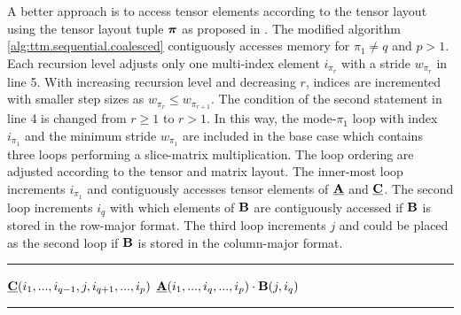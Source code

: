 A better approach is to access tensor elements according to the tensor layout using the tensor layout tuple $\boldsymbol{\pi}$ as proposed in \cite{bassoy:2018:fast}.
The modified algorithm \ref{alg:ttm.sequential.coalesced} contiguously accesses memory for $\pi_1 \neq q$ and $p > 1$.
Each recursion level adjusts only one multi-index element $i_{\pi_r}$ with a stride $w_{\pi_r}$ in line 5.
With increasing recursion level and decreasing $r$, indices are incremented with smaller step sizes as $w_{\pi_r} \leq w_{\pi_{r+1}}$. 
The condition of the second  statement in line 4 is changed from $r \geq 1$ to $r > 1$.
In this way, the mode-$\pi_1$ loop with index $i_{\pi_1}$ and the minimum stride $w_{\pi_1}$ are included in the base case which contains three loops performing a slice-matrix multiplication. 
The loop ordering are adjusted according to the tensor and matrix layout.
The inner-most loop increments $i_{\pi_1}$ and contiguously accesses tensor elements of $\mubA$ and $\mubC$.
The second loop increments $i_q$ with which elements of $\mathbf{B}$ are contiguously accessed if $\mathbf{B}$ is stored in the row-major format.
The third loop increments $j$ and could be placed as the second loop if $\mathbf{B}$ is stored in the column-major format.

\begin{algorithm}[t]
\DontPrintSemicolon
{}
%
\footnotesize 
\SetAlgoVlined
\hrule
\BlankLine
{}
{
	{
	}
	{
		{
			\;
		}		
	}	
	\Else%
	{
		{
			{			
				{
					$\underline{\mathbf{C}}(i_1,...,i_{q-1},j,i_{q+1},...,i_{p})$ \ttt{+=} $\underline{\mathbf{A}}(i_1,...,i_q,...,i_p) \cdot \mathbf{B}(j,i_q)$\;
				}
			}
		}
	}
}
\BlankLine
\hrule
\caption{
\footnotesize %
Modified baseline algorithm with contiguous memory access for the tensor-matrix multiplication.
The tensor order must be greater than one and for the contraction mode $1 \leq q \leq p$ and $\pi_1 \neq q$ must hold.
The algorithm needs to be initially called with $r=p$ where $\mbn$ is the shape tuple of $\mubA$ and $m$ is the $q$-th dimension of $\mubC$. 
\label{alg:ttm.sequential.coalesced}
}
\end{algorithm}

